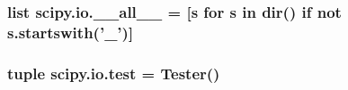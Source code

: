 \subsubsection[{\+\_\+\+\_\+all\+\_\+\+\_\+}]{\setlength{\rightskip}{0pt plus 5cm}list scipy.\+io.\+\_\+\+\_\+all\+\_\+\+\_\+ = \mbox{[}{\bf s} for {\bf s} in dir() {\bf if} not s.\+startswith('\+\_\+')\mbox{]}}\label{namespacescipy_1_1io_a8a30db83c98e4b0529669fa0d23058c1}
\hypertarget{namespacescipy_1_1io_ad5fbfd6f6d543703dd69dffa57c43063}{}
\subsubsection[{test}]{\setlength{\rightskip}{0pt plus 5cm}tuple scipy.\+io.\+test = Tester()}\label{namespacescipy_1_1io_ad5fbfd6f6d543703dd69dffa57c43063}
